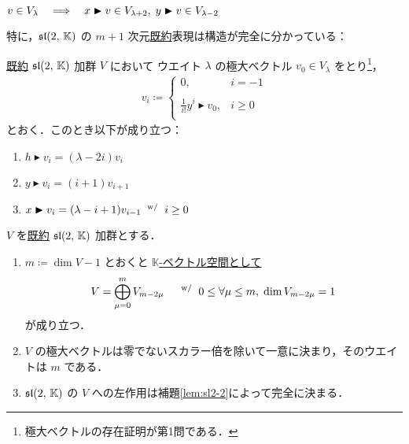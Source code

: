 \documentclass{ltjsarticle}
\theoremstyle{mystyle} %
\numberwithin{equation}{section}
\newcommand{\btr}{\blacktriangleright}
\begin{document}
\begin{mylem}[label=lem:sl2-1]{}
	$v \in V_\lambda \IMP x \btr v \in V_{\lambda +2},\; y \btr v \in V_{\lambda - 2}$
\end{mylem}

特に，$\mathfrak{sl}(2,\, \mathbb{K})$ の $m+1$ 次元\underline{既約}表現は構造が完全に分かっている：

\begin{mylem}[label=lem:sl2-2]{}
    \underline{既約} $\mathfrak{sl}(2,\, \mathbb{K})$ 加群 $V$ において
    ウエイト $\lambda$ の極大ベクトル $v_0 \in V_\lambda$ をとり\footnote{極大ベクトルの存在証明が第1問である．}，
    \begin{align}
        v_i \coloneqq 
        \begin{cases}
            0, & i = -1 \\
            & \\
            \displaystyle \frac{1}{i!} y^i \btr v_0, & i \ge 0 \\
        \end{cases}
    \end{align}
    とおく．このとき以下が成り立つ：
	\begin{enumerate}
		\item $h \btr v_i = (\lambda - 2i) v_i$
		\item $y \btr v_i = (i+1) v_{i+1}$
		\item $x \btr v_i = (\lambda - i+1) v_{i-1}\WHERE i \ge 0$
	\end{enumerate}
\end{mylem}

\begin{mytheo}[label=thm:irr-sl2,breakable]{}
	$V$ を\underline{既約} $\mathfrak{sl}(2,\, \mathbb{K})$ 加群とする．
	\begin{enumerate}
		\item $m \coloneqq \dim V - 1$ とおくと \underline{$\mathbb{K}$-ベクトル空間として}
		\begin{align}
			V = \bigoplus_{\mu = 0}^m V_{m-2\mu}\quad \mathrel{} {}^{\mathrm{w}/} \mathrel{} 0 \le \forall \mu \le m,\; \dim V_{m - 2\mu} = 1
		\end{align}
		が成り立つ．
		\item $V$ の極大ベクトルは零でないスカラー倍を除いて一意に決まり，そのウエイトは $m$ である．
		\item $\mathfrak{sl}(2,\, \mathbb{K})$ の $V$ への左作用は補題\ref{lem:sl2-2}によって完全に決まる．
	\end{enumerate}
\end{mytheo}
\end{document}
